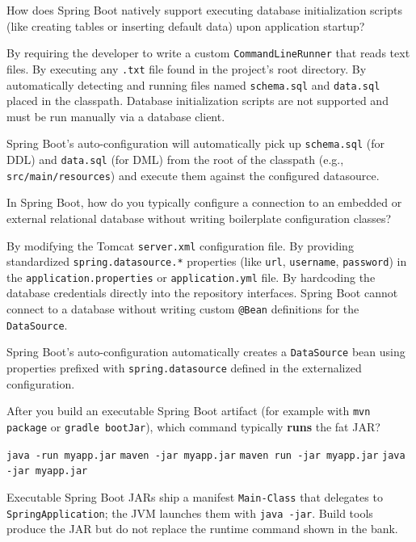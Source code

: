 \question[4]
How does Spring Boot natively support executing database initialization scripts (like creating tables or inserting default data) upon application startup?
\begin{choices}
  \choice By requiring the developer to write a custom \texttt{CommandLineRunner} that reads text files.
  \choice By executing any \texttt{.txt} file found in the project's root directory.
  \CorrectChoice By automatically detecting and running files named \texttt{schema.sql} and \texttt{data.sql} placed in the classpath.
  \choice Database initialization scripts are not supported and must be run manually via a database client.
\end{choices}
\begin{solution}
  Spring Boot's auto-configuration will automatically pick up \texttt{schema.sql} (for DDL) and \texttt{data.sql} (for DML) from the root of the classpath (e.g., \texttt{src/main/resources}) and execute them against the configured datasource.
\end{solution}

\question[4]
In Spring Boot, how do you typically configure a connection to an embedded or external relational database without writing boilerplate configuration classes?
\begin{choices}
  \choice By modifying the Tomcat \texttt{server.xml} configuration file.
  \CorrectChoice By providing standardized \texttt{spring.datasource.*} properties (like \texttt{url}, \texttt{username}, \texttt{password}) in the \texttt{application.properties} or \texttt{application.yml} file.
  \choice By hardcoding the database credentials directly into the repository interfaces.
  \choice Spring Boot cannot connect to a database without writing custom \texttt{@Bean} definitions for the \texttt{DataSource}.
\end{choices}
\begin{solution}
  Spring Boot's auto-configuration automatically creates a \texttt{DataSource} bean using properties prefixed with \texttt{spring.datasource} defined in the externalized configuration.
\end{solution}


\question[4]
After you build an executable Spring Boot artifact (for example with \texttt{mvn package} or \texttt{gradle bootJar}), which command typically \textbf{runs} the fat JAR?
\begin{choices}
  \choice \texttt{java -run myapp.jar}
  \choice \texttt{maven -jar myapp.jar}
  \choice \texttt{maven run -jar myapp.jar}
  \CorrectChoice \texttt{java -jar myapp.jar}
\end{choices}
\begin{solution}
  Executable Spring Boot JARs ship a manifest \texttt{Main-Class} that delegates to \texttt{SpringApplication}; the JVM launches them with \texttt{java -jar}. Build tools produce the JAR but do not replace the runtime command shown in the bank.
\end{solution}

